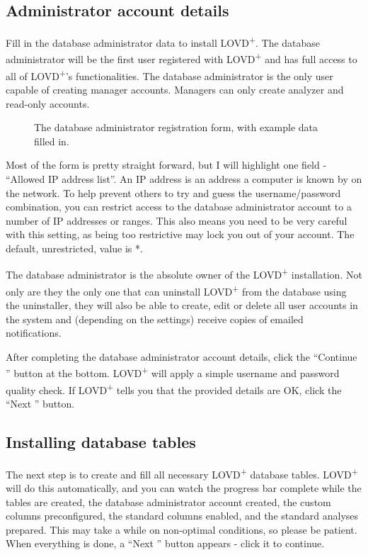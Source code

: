 \subsection{Administrator account details}
Fill in the database administrator data to install LOVD\textsuperscript{+}.
The database administrator will be the first user registered with LOVD\textsuperscript{+}
 and has full access to all of LOVD\textsuperscript{+}'s functionalities.
The database administrator is the only user capable of creating manager accounts.
Managers can only create analyzer and read-only accounts.

\begin{figure}[ht]
  \begin{shaded}
  \caption{The database administrator registration form, with example data filled in.}
  \end{shaded}
\end{figure}

Most of the form is pretty straight forward, but I will highlight one field - ``Allowed IP address list''.
An IP address is an address a computer is known by on the network.
To help prevent others to try and guess the username/password combination,
 you can restrict access to the database administrator account to a number of IP addresses or ranges.
This also means you need to be very careful with this setting,
 as being too restrictive may lock you out of your account.
The default, unrestricted, value is *.

\begin{infotable}
The database administrator is the absolute owner of the LOVD\textsuperscript{+} installation.
Not only are they the only one that can uninstall LOVD\textsuperscript{+} from the database using the uninstaller,
 they will also be able to create, edit or delete all user accounts in the system and
 (depending on the settings) receive copies of emailed notifications.
\end{infotable}

\noindent
After completing the database administrator account details,
 click the ``Continue \guillemotright'' button at the bottom.
LOVD\textsuperscript{+} will apply a simple username and password quality check.
If LOVD\textsuperscript{+} tells you that the provided details are OK, click the ``Next \guillemotright'' button.



\subsection{Installing database tables}
The next step is to create and fill all necessary LOVD\textsuperscript{+} database tables.
LOVD\textsuperscript{+} will do this automatically,
 and you can watch the progress bar complete while the tables are created,
 the database administrator account created, the custom columns preconfigured,
 the standard columns enabled, and the standard analyses prepared.
This may take a while on non-optimal conditions, so please be patient.
When everything is done, a ``Next \guillemotright'' button appears - click it to continue.


